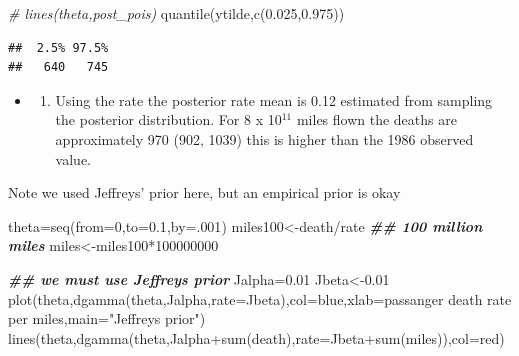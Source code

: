 \documentclass[
]{book}
\newenvironment{Shaded}{\begin{snugshade}}{\end{snugshade}}
\newcommand{\AttributeTok}[1]{\textcolor[rgb]{0.77,0.63,0.00}{#1}}
\newcommand{\CommentTok}[1]{\textcolor[rgb]{0.56,0.35,0.01}{\textit{#1}}}
\newcommand{\DecValTok}[1]{\textcolor[rgb]{0.00,0.00,0.81}{#1}}
\newcommand{\DocumentationTok}[1]{\textcolor[rgb]{0.56,0.35,0.01}{\textbf{\textit{#1}}}}
\newcommand{\FloatTok}[1]{\textcolor[rgb]{0.00,0.00,0.81}{#1}}
\newcommand{\FunctionTok}[1]{\textcolor[rgb]{0.00,0.00,0.00}{#1}}
\newcommand{\NormalTok}[1]{#1}
\newcommand{\OtherTok}[1]{\textcolor[rgb]{0.56,0.35,0.01}{#1}}
\newcommand{\SpecialCharTok}[1]{\textcolor[rgb]{0.00,0.00,0.00}{#1}}
\newcommand{\StringTok}[1]{\textcolor[rgb]{0.31,0.60,0.02}{#1}}
\providecommand{\tightlist}{%
  \setlength{\itemsep}{0pt}\setlength{\parskip}{0pt}}
\theoremstyle{definition}
\theoremstyle{definition}
\theoremstyle{definition}
\theoremstyle{definition}
\theoremstyle{remark}
\begin{document}
\begin{Shaded}
\begin{Highlighting}[]
\CommentTok{\# lines(theta,post\_pois)}
 \FunctionTok{quantile}\NormalTok{(ytilde,}\FunctionTok{c}\NormalTok{(}\FloatTok{0.025}\NormalTok{,}\FloatTok{0.975}\NormalTok{))}
\end{Highlighting}
\end{Shaded}

\begin{verbatim}
##  2.5% 97.5% 
##   640   745
\end{verbatim}

\begin{itemize}
\item
  \begin{enumerate}
  \def\labelenumi{(\alph{enumi})}
  \setcounter{enumi}{3}
  \tightlist
  \item
    Using the rate the posterior rate mean is 0.12 estimated from sampling the posterior distribution. For 8 x 10\(^11\) miles flown the deaths are approximately 970 (902, 1039) this is higher than the 1986 observed value.
  \end{enumerate}
\end{itemize}

Note we used Jeffreys' prior here, but an empirical prior is okay

\begin{Shaded}
\begin{Highlighting}[]
\NormalTok{  theta}\OtherTok{=}\FunctionTok{seq}\NormalTok{(}\AttributeTok{from=}\DecValTok{0}\NormalTok{,}\AttributeTok{to=}\FloatTok{0.1}\NormalTok{,}\AttributeTok{by=}\NormalTok{.}\DecValTok{001}\NormalTok{)}
\NormalTok{ miles100}\OtherTok{\textless{}{-}}\NormalTok{death}\SpecialCharTok{/}\NormalTok{rate }\DocumentationTok{\#\# 100 million miles}
\NormalTok{ miles}\OtherTok{\textless{}{-}}\NormalTok{miles100}\SpecialCharTok{*}\DecValTok{100000000}

 


   
  \DocumentationTok{\#\# we must use Jeffreys\textquotesingle{} prior}
\NormalTok{    Jalpha}\OtherTok{=}\FloatTok{0.01}
\NormalTok{  Jbeta}\OtherTok{\textless{}{-}}\FloatTok{0.01}
 \FunctionTok{plot}\NormalTok{(theta,}\FunctionTok{dgamma}\NormalTok{(theta,Jalpha,}\AttributeTok{rate=}\NormalTok{Jbeta),}\AttributeTok{col=}\StringTok{\textquotesingle{}blue\textquotesingle{}}\NormalTok{,}\AttributeTok{xlab=}\StringTok{\textquotesingle{}passanger death rate per miles\textquotesingle{}}\NormalTok{,}\AttributeTok{main=}\StringTok{"Jeffreys\textquotesingle{} prior"}\NormalTok{)}
\FunctionTok{lines}\NormalTok{(theta,}\FunctionTok{dgamma}\NormalTok{(theta,Jalpha}\SpecialCharTok{+}\FunctionTok{sum}\NormalTok{(death),}\AttributeTok{rate=}\NormalTok{Jbeta}\SpecialCharTok{+}\FunctionTok{sum}\NormalTok{(miles)),}\AttributeTok{col=}\StringTok{\textquotesingle{}red\textquotesingle{}}\NormalTok{)}
\end{Highlighting}
\end{Shaded}
\end{document}
